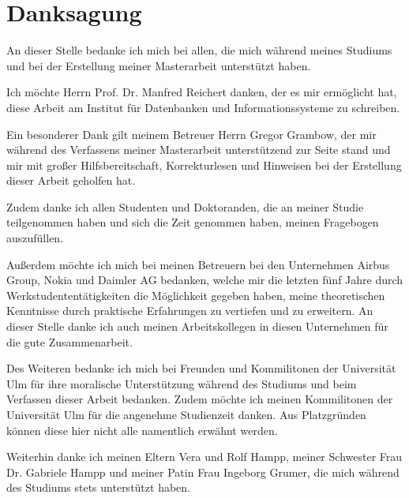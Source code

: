 \section*{Danksagung}

An dieser Stelle bedanke ich mich bei allen, die mich während meines Studiums und bei der Erstellung meiner Masterarbeit unterstützt haben.

Ich möchte Herrn Prof. Dr. Manfred Reichert danken, der es mir ermöglicht hat, diese Arbeit am Institut für Datenbanken und Informationssysteme zu schreiben.

Ein besonderer Dank gilt meinem Betreuer Herrn Gregor Grambow, der mir während des Verfassens meiner Masterarbeit unterstützend zur Seite stand und mir mit großer Hilfsbereitschaft, Korrekturlesen und Hinweisen bei der Erstellung dieser Arbeit geholfen hat.

Zudem danke ich allen Studenten und Doktoranden, die an meiner Studie teilgenommen haben und sich die Zeit genommen haben, meinen Fragebogen auszufüllen.

Außerdem möchte ich mich bei meinen Betreuern bei den Unternehmen Airbus Group, Nokia und Daimler AG bedanken, welche mir die letzten fünf Jahre durch Werkstudententätigkeiten die Möglichkeit gegeben haben, meine theoretischen Kenntnisse durch praktische Erfahrungen zu vertiefen und zu erweitern. 
An dieser Stelle danke ich auch meinen Arbeitskollegen in diesen Unternehmen für die gute Zusammenarbeit.

Des Weiteren bedanke ich mich bei Freunden und Kommilitonen der Universität Ulm für ihre moralische Unterstützung während des Studiums und beim Verfassen dieser Arbeit bedanken. Zudem möchte ich meinen Kommilitonen der Universität Ulm für die angenehme Studienzeit danken. Aus Platzgründen können diese hier nicht alle namentlich erwähnt werden.

Weiterhin danke ich meinen Eltern Vera und Rolf Hampp, meiner Schwester Frau Dr. Gabriele Hampp und meiner Patin Frau Ingeborg Grumer, die mich während des Studiums stets unterstützt haben.